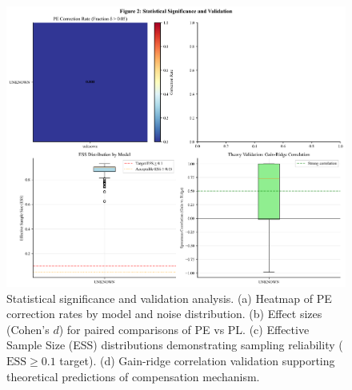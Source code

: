 \documentclass[conference]{IEEEtran}
\begin{document}
\begin{figure}[htb]
\centering
\includegraphics[width=\columnwidth]{figures/figure_2_statistical_significance.png}
\caption{Statistical significance and validation analysis. 
(a) Heatmap of PE correction rates by model and noise distribution. 
(b) Effect sizes (Cohen's $d$) for paired comparisons of PE vs PL. 
(c) Effective Sample Size (ESS) distributions demonstrating sampling reliability ($\text{ESS} \geq 0.1$ target). 
(d) Gain-ridge correlation validation supporting theoretical predictions of compensation mechanism.}
\label{fig:statistical}
\end{figure}
\end{document}
